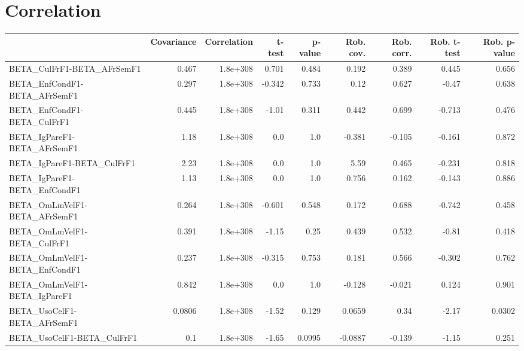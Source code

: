 \section{Correlation}
\begin{tabular}{lrrrrrrrr}
\toprule
{} &  Covariance &  Correlation &   t-test &  p-value &  Rob. cov. &  Rob. corr. &  Rob. t-test &  Rob. p-value \\
\midrule
BETA\_CulFrF1-BETA\_AFrSemF1            &       0.467 &     1.8e+308 &    0.701 &    0.484 &      0.192 &       0.389 &        0.445 &         0.656 \\
BETA\_EnfCondF1-BETA\_AFrSemF1          &       0.297 &     1.8e+308 &   -0.342 &    0.733 &       0.12 &       0.627 &        -0.47 &         0.638 \\
BETA\_EnfCondF1-BETA\_CulFrF1           &       0.445 &     1.8e+308 &    -1.01 &    0.311 &      0.442 &       0.699 &       -0.713 &         0.476 \\
BETA\_IgPareF1-BETA\_AFrSemF1           &        1.18 &     1.8e+308 &      0.0 &      1.0 &     -0.381 &      -0.105 &       -0.161 &         0.872 \\
BETA\_IgPareF1-BETA\_CulFrF1            &        2.23 &     1.8e+308 &      0.0 &      1.0 &       5.59 &       0.465 &       -0.231 &         0.818 \\
BETA\_IgPareF1-BETA\_EnfCondF1          &        1.13 &     1.8e+308 &      0.0 &      1.0 &      0.756 &       0.162 &       -0.143 &         0.886 \\
BETA\_OmLmVelF1-BETA\_AFrSemF1          &       0.264 &     1.8e+308 &   -0.601 &    0.548 &      0.172 &       0.688 &       -0.742 &         0.458 \\
BETA\_OmLmVelF1-BETA\_CulFrF1           &       0.391 &     1.8e+308 &    -1.15 &     0.25 &      0.439 &       0.532 &        -0.81 &         0.418 \\
BETA\_OmLmVelF1-BETA\_EnfCondF1         &       0.237 &     1.8e+308 &   -0.315 &    0.753 &      0.181 &       0.566 &       -0.302 &         0.762 \\
BETA\_OmLmVelF1-BETA\_IgPareF1          &       0.842 &     1.8e+308 &      0.0 &      1.0 &     -0.128 &      -0.021 &        0.124 &         0.901 \\
BETA\_UsoCelF1-BETA\_AFrSemF1           &      0.0806 &     1.8e+308 &    -1.52 &    0.129 &     0.0659 &        0.34 &        -2.17 &        0.0302 \\
BETA\_UsoCelF1-BETA\_CulFrF1            &         0.1 &     1.8e+308 &    -1.65 &   0.0995 &    -0.0887 &      -0.139 &        -1.15 &         0.251 \\

\end{tabular}
